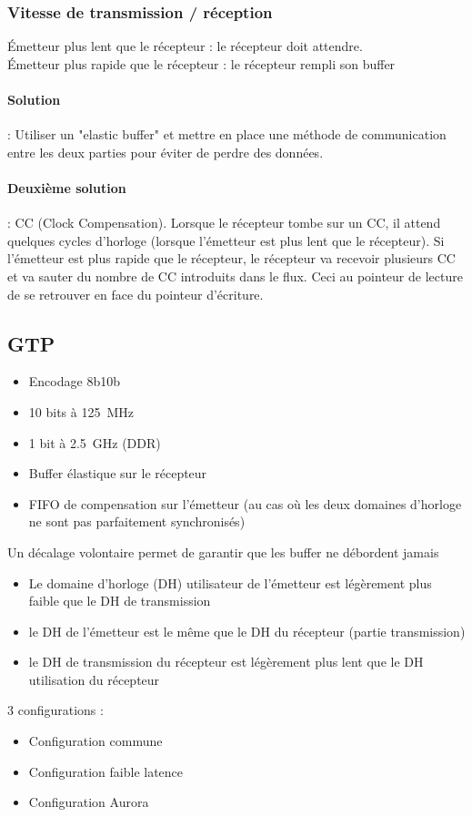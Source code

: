\documentclass[resume]{subfiles}
\begin{document}
\subsubsection{Vitesse de transmission / réception}
Émetteur plus lent que le récepteur : le récepteur doit attendre.\\
Émetteur plus rapide que le récepteur : le récepteur rempli son buffer
\paragraph{Solution} : Utiliser un "elastic buffer" et mettre en place une méthode de communication entre les deux parties pour éviter de perdre des données.
\paragraph{Deuxième solution} : CC (Clock Compensation). Lorsque le récepteur tombe sur un CC, il attend quelques cycles d'horloge (lorsque l'émetteur est plus lent que le récepteur). Si l'émetteur est plus rapide que le récepteur, le récepteur va recevoir plusieurs CC et va sauter du nombre de CC introduits dans le flux. Ceci au pointeur de lecture de se retrouver en face du pointeur d'écriture.

\subsection{GTP}
\begin{itemize}
\item Encodage 8b10b
\item 10 bits à \SI{125}{\mega\hertz}
\item 1 bit à \SI{2.5}{\giga\hertz} (DDR)
\item Buffer élastique sur le récepteur
\item FIFO de compensation sur l'émetteur (au cas où les deux domaines d'horloge ne sont pas parfaitement synchronisés)
\end{itemize}
Un décalage volontaire permet de garantir que les buffer ne débordent jamais
\begin{itemize}
\item Le domaine d'horloge (DH) utilisateur de l'émetteur est légèrement plus faible que le DH de transmission
\item le DH de l'émetteur est le même que le DH du récepteur (partie transmission)
\item le DH de transmission du récepteur est légèrement plus lent que le DH utilisation du récepteur
\end{itemize}

3 configurations :
\begin{itemize}
\item Configuration commune
\item Configuration faible latence
\item Configuration Aurora
\end{itemize}
\end{document}
